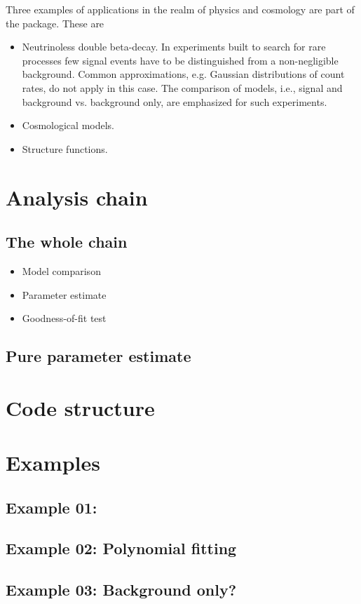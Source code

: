 \documentclass[11pt, a4paper]{article}
\begin{document}
Three examples of applications in the realm of physics and cosmology
are part of the package. These are 

\begin{itemize}
% 
\item Neutrinoless double beta-decay. In experiments built to search
for rare processes few signal events have to be distinguished from a
non-negligible background. Common approximations, e.g. Gaussian
distributions of count rates, do not apply in this case. The
comparison of models, i.e., signal and background vs. background only,
are emphasized for such experiments. 
% 
\item Cosmological models.  
%
\item Structure functions. 
%
\end{itemize}


\section{Analysis chain}

\subsection{The whole chain} 

\begin{itemize} 
\item Model comparison 
\item Parameter estimate 
\item Goodness-of-fit test 
\end{itemize}

\subsection{Pure parameter estimate} 


\section{Code structure}


\section{Examples}

\subsection{Example 01: } 

\subsection{Example 02: Polynomial fitting} 

\subsection{Example 03: Background only?} 

\end{document}
